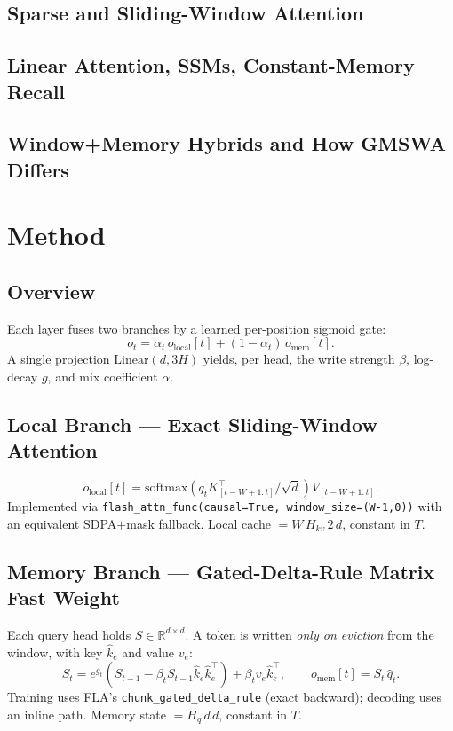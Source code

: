 \documentclass[11pt]{article}
\begin{document}
\subsection{Sparse and Sliding-Window Attention}
\subsection{Linear Attention, SSMs, Constant-Memory Recall}
\subsection{Window+Memory Hybrids and How GMSWA Differs}

\section{Method}
\subsection{Overview}
Each layer fuses two branches by a learned per-position sigmoid gate:
\begin{equation}
o_t = \alpha_t \, o_{\text{local}}[t] + (1-\alpha_t)\, o_{\text{mem}}[t].
\end{equation}
A single projection $\mathrm{Linear}(d,3H)$ yields, per head, the write strength $\beta$,
log-decay $g$, and mix coefficient $\alpha$.

\subsection{Local Branch --- Exact Sliding-Window Attention}
\begin{equation}
o_{\text{local}}[t] = \mathrm{softmax}\!\left( q_t K_{[t-W+1:t]}^\top / \sqrt{d} \right) V_{[t-W+1:t]}.
\end{equation}
Implemented via \texttt{flash\_attn\_func(causal=True, window\_size=(W-1,0))} with an
equivalent SDPA${+}$mask fallback. Local cache $=W\,H_{kv}\,2\,d$, constant in $T$.

\subsection{Memory Branch --- Gated-Delta-Rule Matrix Fast Weight}
Each query head holds $S\in\mathbb{R}^{d\times d}$. A token is written \emph{only on
eviction} from the window, with key $\hat{k}_e$ and value $v_e$:
\begin{equation}
S_t = e^{g_t}\!\left( S_{t-1} - \beta_t S_{t-1}\hat{k}_e \hat{k}_e^\top \right) + \beta_t v_e \hat{k}_e^\top,
\qquad o_{\text{mem}}[t] = S_t\,\hat{q}_t .
\end{equation}
Training uses FLA's \texttt{chunk\_gated\_delta\_rule} (exact backward); decoding uses an
inline path. Memory state $=H_q\,d\,d$, constant in $T$.
\end{document}
